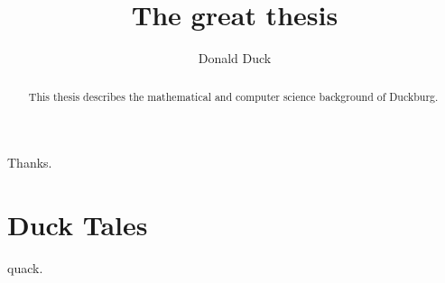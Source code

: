 \documentclass{kaumasters}
\title{The great thesis}
\author{Donald Duck}
\institute{Department of Mathematics and Computer Science}
\begin{document}
\frontmatter
\begin{abstract}
  This thesis describes the mathematical and computer science
  background of Duckburg.
\end{abstract}
\begin{acknowledgements}
  Thanks.
\end{acknowledgements}
\tableofcontents
\mainmatter
\section{Duck Tales}
quack.
\end{document}
